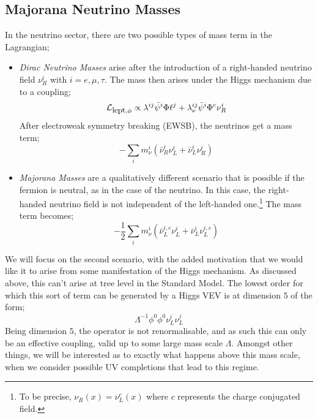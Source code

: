 \documentclass[10pt]{article}
\begin{document}
\subsection{Majorana Neutrino Masses}\label{sec:Majorana Neutrino Masses}
In the neutrino sector, there are two possible types of mass term in the Lagrangian;
\begin{itemize}
  \item \textit{Dirac Neutrino Masses} arise after the introduction of a right-handed neutrino field $\nu^i_R$ with $i = e, \mu, \tau$. The mass then arises under the Higgs mechanism due to a coupling;
  \begin{equation}
    \mathcal{L}_{\textrm{\small lept}, \phi} \propto \lambda^{ij}\bar{\psi}^i\Phi\ell^j + \lambda_\nu^{ij}\bar{\psi}^i\Phi^c \nu^i_R
  \end{equation}
  After electroweak symmetry breaking (EWSB), the neutrinos get a mass term;
  \begin{equation}
    -\sum_{i}{m_\nu^i \left(\bar{\nu}^i_R \nu^i_L + \bar{\nu}^i_L \nu^i_R\right)}
  \end{equation}
  \item \textit{Majorana Masses} are a qualitatively different scenario that is possible if the fermion is neutral, as in the case of the neutrino. In this case, the right-handed neutrino field is not independent of the left-handed one.\footnote{To be precise, $\nu_R(x) =
  \nu_L^c(x)$ where $c$ represents the charge conjugated field.} The mass term becomes;
  \begin{equation}\label{eq:Majorana Mass Term}
    -\frac{1}{2}\sum_{i}{m_\nu^i \left(\bar{\nu}_L^{i,c}\nu_L^i + \bar{\nu}^i_L \nu^{i, c}_L\right)}
  \end{equation}
\end{itemize}
We will focus on the second scenario, with the added motivation that we would like it to arise from some manifestation of the Higgs mechanism. As discussed above, this can't arise at tree level in the Standard Model. The lowest order for which this sort of term can be generated by a Higgs VEV is at dimension $5$ \cite{Bonnet2012} of the form;
\begin{equation}
  \Lambda^{-1}\phi^0 \phi^0 \nu^i_L \nu^j_L
\end{equation}
Being dimension $5$, the operator is not renormalisable, and as such this can only be an effective coupling, valid up to some large mass scale $\Lambda$. Amongst other things, we will be interested as to exactly what happens above this mass scale, when we consider possible UV completions that lead to this regime.
\end{document}
